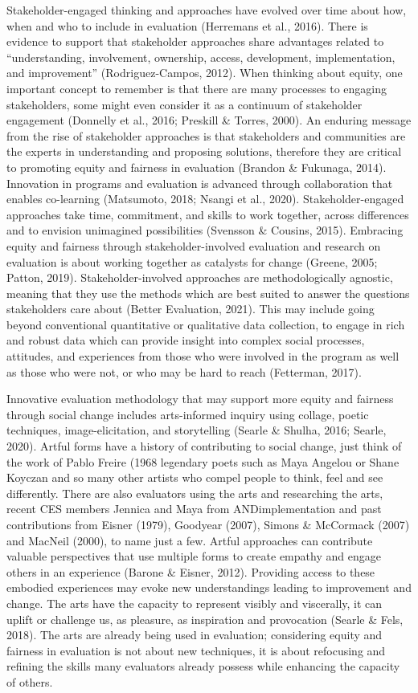 \documentclass[
]{book}
\begin{document}
Stakeholder-engaged thinking and approaches have evolved over time about how, when and who to include in evaluation (Herremans et al., 2016). There is evidence to support that stakeholder approaches share advantages related to ``understanding, involvement, ownership, access, development, implementation, and improvement'' (Rodriguez-Campos, 2012). When thinking about equity, one important concept to remember is that there are many processes to engaging stakeholders, some might even consider it as a continuum of stakeholder engagement (Donnelly et al., 2016; Preskill \& Torres, 2000). An enduring message from the rise of stakeholder approaches is that stakeholders and communities are the experts in understanding and proposing solutions, therefore they are critical to promoting equity and fairness in evaluation (Brandon \& Fukunaga, 2014). Innovation in programs and evaluation is advanced through collaboration that enables co-learning (Matsumoto, 2018; Nsangi et al., 2020). Stakeholder-engaged approaches take time, commitment, and skills to work together, across differences and to envision unimagined possibilities (Svensson \& Cousins, 2015). Embracing equity and fairness through stakeholder-involved evaluation and research on evaluation is about working together as catalysts for change (Greene, 2005; Patton, 2019). Stakeholder-involved approaches are methodologically agnostic, meaning that they use the methods which are best suited to answer the questions stakeholders care about (Better Evaluation, 2021). This may include going beyond conventional quantitative or qualitative data collection, to engage in rich and robust data which can provide insight into complex social processes, attitudes, and experiences from those who were involved in the program as well as those who were not, or who may be hard to reach (Fetterman, 2017).

Innovative evaluation methodology that may support more equity and fairness through social change includes arts-informed inquiry using collage, poetic techniques, image-elicitation, and storytelling (Searle \& Shulha, 2016; Searle, 2020). Artful forms have a history of contributing to social change, just think of the work of Pablo Freire (1968 legendary poets such as Maya Angelou or Shane Koyczan and so many other artists who compel people to think, feel and see differently. There are also evaluators using the arts and researching the arts, recent CES members Jennica and Maya from ANDimplementation and past contributions from Eisner (1979), Goodyear (2007), Simons \& McCormack (2007) and MacNeil (2000), to name just a few. Artful approaches can contribute valuable perspectives that use multiple forms to create empathy and engage others in an experience (Barone \& Eisner, 2012). Providing access to these embodied experiences may evoke new understandings leading to improvement and change. The arts have the capacity to represent visibly and viscerally, it can uplift or challenge us, as pleasure, as inspiration and provocation (Searle \& Fels, 2018). The arts are already being used in evaluation; considering equity and fairness in evaluation is not about new techniques, it is about refocusing and refining the skills many evaluators already possess while enhancing the capacity of others.
\end{document}
